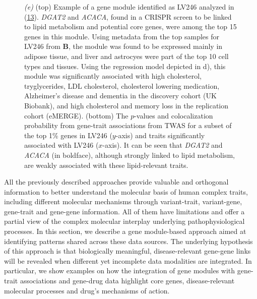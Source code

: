 \begin{figure}
{{\emph{(e)} (top) Example of a gene module identified as LV246 analyzed in (\protect\hyperlink{ref-NM3rHx1i}{13}).
\emph{DGAT2} and \emph{ACACA}, found in a CRISPR screen to be linked to lipid metabolism and potential core genes, were among the top 15 genes in this module.
Using metadata from the top samples for LV246 from \(\mathbf{B}\), the module was found to be expressed mainly in adipose tissue, and liver and astrocyes were part of the top 10 cell types and tissues.
Using the regression model depicted in d), this module was significantly associated with high cholesterol, tryglycerides, LDL cholesterol, cholesterol lowering medication, Alzheimer's disease and dementia in the discovery cohort (UK Biobank), and high cholesterol and memory loss in the replication cohort (eMERGE).
(bottom) The \(p\)-values and colocalization probability from gene-trait associations from TWAS for a subset of the top 1\% genes in LV246 (\(y\)-axis) and traits significantly associated with LV246 (\(x\)-axis).
It can be seen that \emph{DGAT2} and \emph{ACACA} (in boldface), although strongly linked to lipid metabolism, are weakly associated with these lipid-relevant traits.}\label{fig:fig4}
}
\end{figure}

All the previously described approaches provide valuable and orthogonal information to better understand the molecular basis of human complex traits, including different molecular mechanisms through variant-trait, variant-gene, gene-trait and gene-gene information.
All of them have limitations and offer a partial view of the complex molecular interplay underlying pathophysiological processes.
In this section, we describe a gene module-based approach aimed at identifying patterns shared across these data sources.
The underlying hypothesis of this approach is that biologically meaningful, disease-relevant gene-gene links will be revealed when different yet incomplete data modalities are integrated.
In particular, we show examples on how the integration of gene modules with gene-trait associations and gene-drug data highlight core genes, disease-relevant molecular processes and drug's mechanisms of action.

